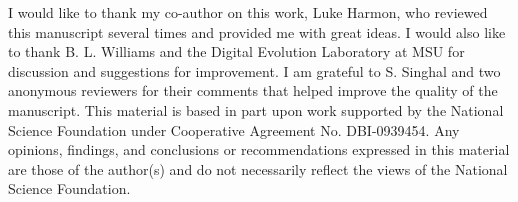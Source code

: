 \begin{doublespace}
I would like to thank my co-author on this work, Luke Harmon,
who reviewed this manuscript several times and provided me with great ideas.
%
I would also like to thank B. L. Williams
and the Digital Evolution Laboratory at MSU
for discussion and suggestions for improvement.
%
I am grateful to S. Singhal and two anonymous reviewers for their comments
that helped improve the quality of the manuscript.
%
This material is based in part upon work supported by
the National Science Foundation under Cooperative Agreement No. DBI-0939454.
%
Any opinions, findings, and conclusions or recommendations
expressed in this material are those of the author(s)
and do not necessarily reflect the views of the National Science Foundation.

\end{doublespace}



